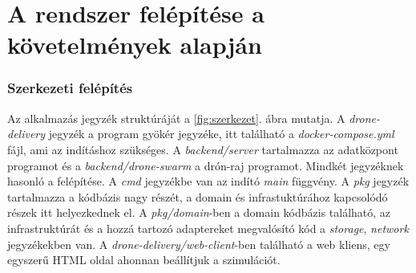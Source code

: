 \section{A rendszer felépítése a követelmények alapján}
\subsubsection{Szerkezeti felépítés}
Az alkalmazás jegyzék struktúráját a \ref{fig:szerkezet}. ábra mutatja.
A \textit{drone-delivery} jegyzék a program gyökér jegyzéke, itt található a \textit{docker-compose.yml} fájl, ami az indításhoz szükséges.
A \textit{backend/server} tartalmazza az adatközpont programot és a \textit{backend/drone-swarm} a drón-raj programot.
Mindkét jegyzéknek hasonló a felépítése.
A \textit{cmd} jegyzékbe van az indító \textit{main} függvény.
A \textit{pkg} jegyzék tartalmazza a kódbázis nagy részét, a domain és infrastuktúrához kapcsolódó részek itt helyezkednek el.
A \textit{pkg/domain}-ben a domain kódbázis található, az infrastruktúrát és a hozzá tartozó adaptereket megvalósító kód a \textit{storage}, \textit{network} jegyzékekben van.
A \textit{drone-delivery/web-client}-ben található a web kliens, egy egyszerű HTML oldal ahonnan beállítjuk a szimulációt.

